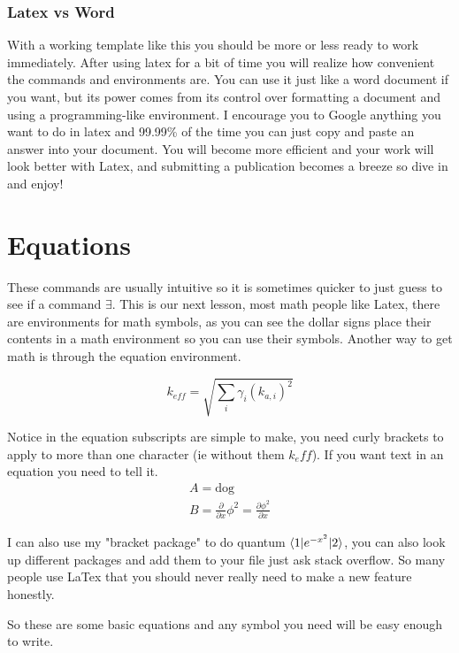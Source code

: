 \documentclass{article}
\begin{document}
\subsubsection{Latex vs Word}
With a working template like this you should be more or less ready to work immediately.
After using latex for a bit of time you will realize how convenient the commands and environments are.
You can use it just like a word document if you want, but its power comes from its control over formatting a document and using a programming-like environment. 
I encourage you to Google anything you want to do in latex and 99.99\% of the time you can just copy and paste an answer into your document.
You will become more efficient and your work will look better with Latex, and submitting a publication becomes a breeze so dive in and enjoy!


\section*{Equations}
These commands are usually intuitive so it is sometimes quicker to just guess to see if a command $\exists$. 
This is our next lesson, most math people like Latex, there are environments for math symbols, as you can see the dollar signs place their contents in a math environment so you can use their symbols. 
Another way to get math is through the equation environment. 

\begin{equation}
k_{eff}=\sqrt{\sum_i{\gamma_i(k_{a,i})^2}}
\end{equation}

Notice in the equation subscripts are simple to make, you need curly brackets to apply to more than one character (ie without them $k_eff$).
If you want text in an equation you need to tell it.
\begin{equation}
\begin{split}
    A = \text{dog}\\
    B = \frac{\partial}{\partial x}\phi^2 = \frac{\partial \phi^2}{\partial x}
\end{split}
\end{equation}

I can also use my "bracket package" to do quantum $\braket{1|e^{-x^2}|2}$, you can also look up different packages and add them to your file just ask stack overflow.
So many people use LaTex that you should never really need to make a new feature honestly. 



So these are some basic equations and any symbol you need will be easy enough to write.
\end{document}

